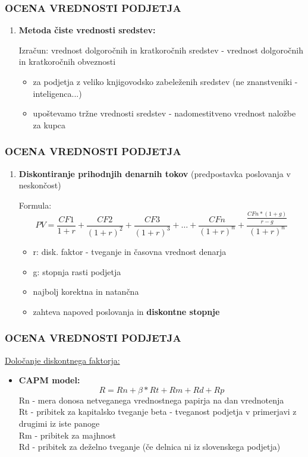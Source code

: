 \documentclass{beamer}
\begin{document}
\begin{frame}
\frametitle{OCENA VREDNOSTI PODJETJA}
\begin{enumerate}[2]
\item \textbf{Metoda čiste vrednosti sredstev:}
\begin{block}{Izračun:}
vrednost dolgoročnih in kratkoročnih sredstev - vrednost dolgoročnih in kratkoročnih obveznosti
\end{block}
\begin{itemize}
\item za podjetja z veliko knjigovodsko zabeleženih sredstev (ne znanstveniki - inteligenca...)
\item upoštevamo tržne vrednosti sredstev - nadomestitveno vrednost naložbe za kupca
\end{itemize}
\end{enumerate}
\end{frame}


\begin{frame}
\frametitle{OCENA VREDNOSTI PODJETJA}
\begin{enumerate}[3]
\item \textbf{Diskontiranje prihodnjih denarnih tokov} (predpostavka poslovanja v neskončost)
\begin{block}{Formula:}
      $$PV=\frac{CF1}{1+r}+\frac{CF2}{(1+r)^2}+\frac{CF3}{(1+r)^3}+\ldots+\frac{CFn}{(1+r)^n}+\frac{\frac{CFn*(1+g)}{r-g}}{(1+r)^n}$$
\end{block}
\begin{itemize}
\item r: disk. faktor - tveganje in časovna vrednost denarja
\item g: stopnja rasti podjetja
\item najbolj korektna in natančna
\item zahteva napoved poslovanja in \textbf{diskontne stopnje}
\end{itemize}
\end{enumerate}
\end{frame}


\begin{frame}
\frametitle{OCENA VREDNOSTI PODJETJA}
\underline{Določanje diskontnega faktorja:}\\
\begin{itemize}
\item \textbf{CAPM model: $$R=Rn+\beta*Rt+Rm+Rd+Rp$$}
 Rn - mera donosa netveganega vrednostnega papirja na dan vrednotenja\\
 Rt - pribitek za kapitalsko tveganje
 beta - tveganost podjetja v primerjavi z drugimi iz iste panoge\\
 Rm -  pribitek za majhnost\\
 Rd - pribitek za deželno tveganje (če delnica ni iz slovenskega podjetja)\\
\end{itemize}
\end{frame}
\end{document}
